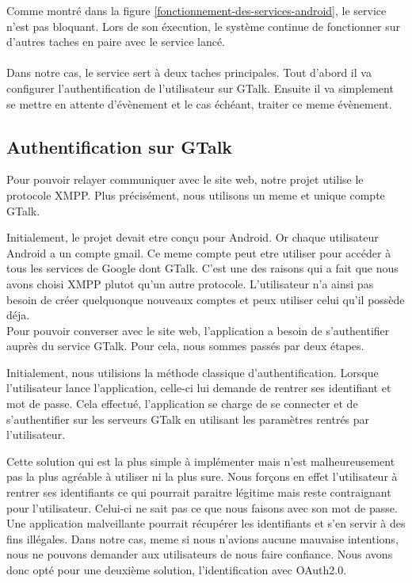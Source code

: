 Comme montré dans la figure \ref{fonctionnement-des-services-android}, le service n'est pas  bloquant. 
Lors de son éxecution, le système continue de fonctionner sur d'autres taches en paire avec le service lancé.
\\\\
Dans notre cas, le service sert à deux taches principales. Tout d'abord il va configurer l'authentification
de l'utilisateur sur GTalk. Ensuite il va simplement se mettre en attente d'évènement et le cas échéant, 
traiter ce meme évènement.




\subsection{Authentification sur GTalk}



Pour pouvoir relayer communiquer avec le site web, notre projet utilise le protocole XMPP. Plus 
précisément, nous utilisons un meme et unique compte GTalk. 

Initialement, le projet devait etre conçu pour Android. Or chaque utilisateur Android a un compte 
gmail. Ce meme compte peut etre utiliser pour accéder à tous les services de Google dont GTalk.
C'est une des raisons qui a fait que nous avons choisi XMPP plutot qu'un autre protocole. L'utilisateur
n'a ainsi pas besoin de créer quelquonque nouveaux comptes et peux utiliser celui qu'il possède déja.
\\


Pour pouvoir converser avec le site web, l'application a besoin de s'authentifier auprès du service
GTalk. Pour cela, nous sommes passés par deux étapes. 

Initialement, nous utilisions la méthode classique d'authentification. Lorsque l'utilisateur lance 
l'application, celle-ci lui demande de rentrer ses identifiant et mot de passe. Cela effectué, 
l'application se charge de se connecter et de s'authentifier sur les serveurs GTalk en utilisant les
paramètres rentrés par l'utilisateur.

Cette solution qui est la plus simple à implémenter mais n'est malheureusement pas la plus agréable
à utiliser ni la plus sure. Nous forçons en effet l'utilisateur à rentrer ses identifiants ce qui 
pourrait paraitre légitime mais reste contraignant pour l'utilisateur. Celui-ci ne sait pas ce que 
nous faisons avec son mot de passe. Une application malveillante pourrait récupérer les identifiants
et s'en servir à des fins illégales. Dans notre cas, meme si nous n'avions aucune mauvaise intentions,
nous ne pouvons demander aux utilisateurs de nous faire confiance. Nous avons donc opté pour une 
deuxième solution, l'identification avec OAuth2.0.

